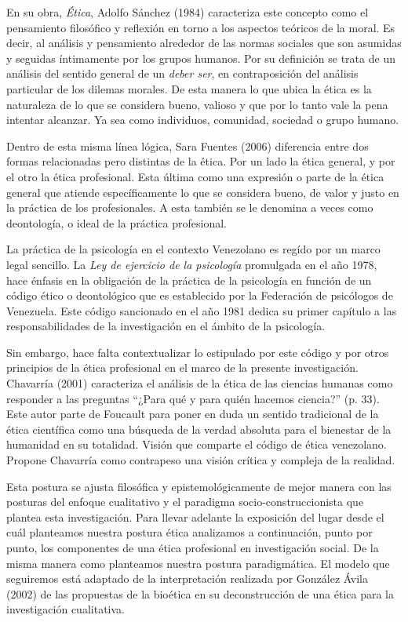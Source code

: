 En su obra, \emph{Ética}, Adolfo Sánchez (1984) caracteriza este
concepto como el pensamiento filosófico y reflexión en torno a los aspectos
teóricos de la moral.
Es decir, al análisis y pensamiento alrededor de las normas sociales que son
asumidas y seguidas íntimamente por los grupos humanos.
Por su definición se trata de un análisis del sentido general de un
\emph{deber ser}, en contraposición del análisis particular de los dilemas
morales.
De esta manera lo que ubica la ética es la naturaleza de lo que se considera
bueno, valioso y que por lo tanto vale la pena intentar alcanzar.
Ya sea como individuos, comunidad, sociedad o grupo humano.

Dentro de esta misma línea lógica, Sara Fuentes (2006) diferencia entre dos
formas relacionadas pero distintas de la ética.
Por un lado la ética general, y por el otro la ética profesional.
Esta última como una expresión o parte de la ética general que atiende
específicamente lo que se considera bueno, de valor y justo en la práctica de
los profesionales.
A esta también se le denomina a veces como deontología, o ideal de la
práctica profesional.

La práctica de la psicología en el contexto Venezolano es regído por un marco
legal sencillo.
La \emph{Ley de ejercicio de la psicología} promulgada en el año 1978, hace
énfasis en la obligación de la práctica de la psicología en función de un
código ético o deontológico que es establecido por la Federación de
psicólogos de Venezuela.
Este código sancionado en el año 1981 dedica su primer capítulo a las
responsabilidades de la investigación en el ámbito de la psicología.

Sin embargo, hace falta contextualizar lo estipulado por este código y por
otros principios de la ética profesional en el marco de la presente
investigación.
Chavarría (2001) caracteriza el análisis de la ética de las ciencias humanas
como responder a las preguntas “¿Para qué y para quién hacemos ciencia?” (p.
33).
Este autor parte de Foucault para poner en duda un sentido tradicional de la
ética científica como una búsqueda de la verdad absoluta para el bienestar de
la humanidad en su totalidad.
Visión que comparte el código de ética venezolano.
Propone Chavarría como contrapeso una visión crítica y compleja de la
realidad.

Esta postura se ajusta filosófica y epistemológicamente de mejor manera con las
posturas del enfoque cualitativo y el paradigma socio-construccionista que
plantea esta investigación.
Para llevar adelante la exposición del lugar desde el cuál planteamos nuestra
postura ética analizamos a continuación, punto por punto, los componentes de
una ética profesional en investigación social.
De la misma manera como planteamos nuestra postura paradigmática.
El modelo que seguiremos está adaptado de la interpretación realizada por
González Ávila (2002) de las propuestas de la bioética en su deconstrucción de
una ética para la investigación cualitativa.

